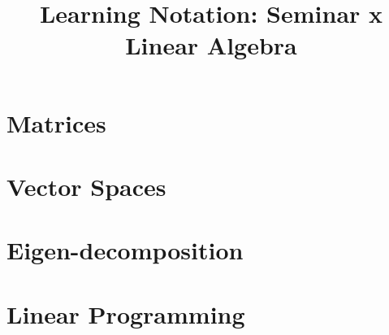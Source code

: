 \documentclass{article}[12pt]
\title{Learning Notation: Seminar x \\ Linear Algebra}
\author{}
\date{}
\begin{document}
    \maketitle

    \section{Matrices}
    
    \section{Vector Spaces}
    
    \section{Eigen-decomposition}
    
    \section{Linear Programming}
    
\end{document}
